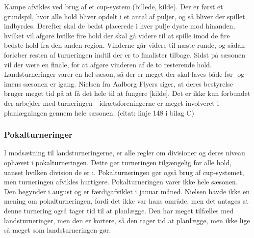 Kampe afvikles ved brug af et cup-system (billede, kilde). Der er først et grundspil, hvor alle hold bliver opdelt i et antal af puljer, og så bliver der spillet indbyrdes. Derefter skal de bedst placerede i hver pulje dyste mod hinanden, hvilket vil afgøre hvilke fire hold der skal gå videre til at spille imod de fire bedste hold fra den anden region. Vinderne går videre til næste runde, og sådan forløber resten af turneringen indtil der er to finalister tilbage.
Sidst på sæsonen vil der være en finale, for at afgøre vinderen af de to resterende hold. Landsturneringer varer en hel sæson, så der er meget der skal laves både før- og imens sæsonen er igang. Nielsen fra Aalborg Flyers siger, at deres bestyrelse bruger meget tid på at få det hele til at fungere [kilde]. Det er ikke kun forbundet der arbejder med turneringen - idrætsforeningerne er meget involveret i planlægningen gennem hele sæsonen. (citat: linje 148 i bilag C) 

\subsubsection*{Pokalturneringer}
I modsætning til landsturneringerne, er alle regler om divisioner og deres niveau ophævet i pokalturneringen. Dette  gør turneringen tilgængelig for alle hold, uanset hvilken division de er i. Pokalturneringen gør også brug af cup-systemet, men turneringen afvikles hurtigere. Pokalturneringen varer ikke hele sæsonen. Den begynder i august og er færdigafviklet i januar måned. Nielsen havde ikke en mening om pokalturneringen, fordi det ikke var hans område, men det antages at denne turnering også tager tid til at planlægge. Den har meget tilfælles med landsturneringer, men den er kortere, så den tager tid at planlægge, men ikke lige så meget som landsturneringen gør.
 
